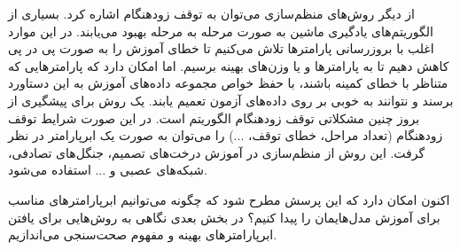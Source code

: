 از دیگر روش‌های منظم‌سازی می‌توان به توقف زودهنگام اشاره کرد. بسیاری از الگوریتم‌های یادگیری ماشین به صورت مرحله به مرحله بهبود می‌یابند. در این موارد اغلب با بروزرسانی پارامتر‌ها تلاش می‌کنیم تا خطای آموزش را به صورت پی در پی کاهش دهیم تا به پارامتر‌ها و یا وزن‌های بهینه برسیم. اما امکان دارد که پارامتر‌هایی که متناظر با خطای کمینه باشند، با حفظ خواص مجموعه داده‌های آموزش به این دستاورد برسند و نتوانند به خوبی بر روی داده‌های آزمون تعمیم یابند. یک روش برای پیشگیری از بروز چنین مشکلاتی توقف زودهنگام الگوریتم است. در این صورت شرایط توقف زودهنگام (تعداد مراحل، خطای توقف، ...) را می‌توان به صورت یک ابرپارامتر در نظر گرفت. این روش از منظم‌سازی در آموزش‌ درخت‌های تصمیم، جنگل‌های تصادفی، شبکه‌های عصبی و ... استفاده می‌شود.

اکنون امکان دارد که این پرسش مطرح شود که چگونه می‌توانیم ابرپارامتر‌های مناسب برای آموزش مدل‌هایمان را پیدا کنیم؟ در بخش بعدی نگاهی به روش‌هایی برای یافتن ابرپارامتر‌های بهینه و مفهوم صحت‌سنجی می‌اندازیم.